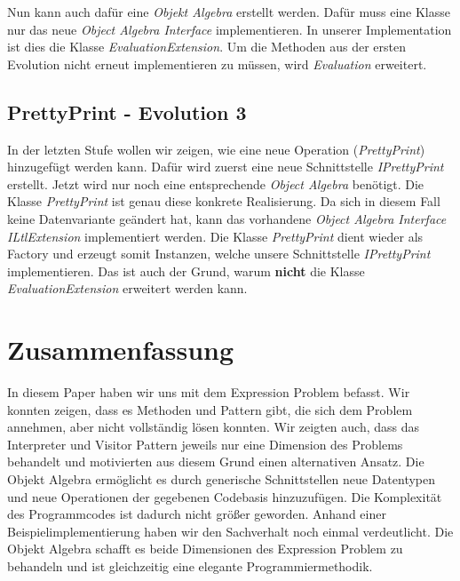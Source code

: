\documentclass{llncs}
\begin{document}
Nun kann auch dafür eine \emph{Objekt Algebra} erstellt werden.
Dafür muss eine Klasse nur das neue \emph{Object Algebra Interface} implementieren. In unserer Implementation ist dies die Klasse \emph{EvaluationExtension}.
Um die Methoden aus der ersten Evolution nicht erneut implementieren zu müssen, wird \emph{Evaluation} erweitert.

\subsection{PrettyPrint - Evolution 3}
In der letzten Stufe wollen wir zeigen, wie eine neue Operation (\emph{PrettyPrint}) hinzugefügt werden kann. Dafür wird zuerst eine neue Schnittstelle \emph{IPrettyPrint} erstellt.
Jetzt wird nur noch eine entsprechende \emph{Object Algebra} benötigt. Die Klasse \emph{PrettyPrint} ist genau diese konkrete Realisierung.
Da sich in diesem Fall keine Datenvariante geändert hat, kann das vorhandene \emph{Object Algebra Interface} \emph{ILtlExtension} implementiert werden.
Die Klasse \emph{PrettyPrint} dient wieder als Factory und erzeugt somit Instanzen, welche unsere Schnittstelle \emph{IPrettyPrint} implementieren.
Das ist auch der Grund, warum \textbf{nicht} die Klasse \emph{EvaluationExtension} erweitert werden kann.

\section{Zusammenfassung} \label{sec:conclusion}

In diesem Paper haben wir uns mit dem Expression Problem befasst. Wir konnten zeigen, dass es Methoden und Pattern gibt, die sich dem Problem annehmen, aber nicht vollständig lösen konnten. Wir zeigten auch, dass das Interpreter und Visitor Pattern jeweils nur eine Dimension des Problems behandelt und motivierten aus diesem Grund einen alternativen Ansatz. Die Objekt Algebra ermöglicht es durch generische Schnittstellen neue Datentypen und neue Operationen der gegebenen Codebasis hinzuzufügen. Die Komplexität des Programmcodes ist dadurch nicht größer geworden. Anhand einer Beispielimplementierung haben wir den Sachverhalt noch einmal verdeutlicht. Die Objekt Algebra schafft es beide Dimensionen des Expression Problem zu behandeln und ist gleichzeitig eine elegante Programmiermethodik.
\end{document}

